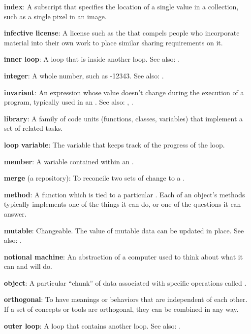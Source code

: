 \documentclass{book}
\begin{document}
\textbf{index}: A subscript that specifies the location of a single
value in a collection, such as a single pixel in an image.

\textbf{infective license}: A license such as the
 that compels people
who incorporate material into their own work to place similar sharing
requirements on it.

\textbf{inner loop}: A loop that is inside another loop. See also:
.

\textbf{integer}: A whole number, such as -12343. See also:
.

\textbf{invariant}: An expression whose value doesn't change during the
execution of a program, typically used in an
. See also:
,
.

\textbf{library}: A family of code units (functions, classes, variables)
that implement a set of related tasks.

\textbf{loop variable}: The variable that keeps track of the progress of
the loop.

\textbf{member}: A variable contained within an
.

\textbf{merge} (a repository): To reconcile two sets of change to a
.

\textbf{method}: A function which is tied to a particular
. Each of an object's methods typically
implements one of the things it can do, or one of the questions it can
answer.

\textbf{mutable}: Changeable. The value of mutable data can be updated
in place. See also: .

\textbf{notional machine}: An abstraction of a computer used to think
about what it can and will do.

\textbf{object}: A particular ``chunk'' of data associated with specific
operations called .

\textbf{orthogonal}: To have meanings or behaviors that are independent
of each other. If a set of concepts or tools are orthogonal, they can be
combined in any way.

\textbf{outer loop}: A loop that contains another loop. See also:
.
\end{document}
